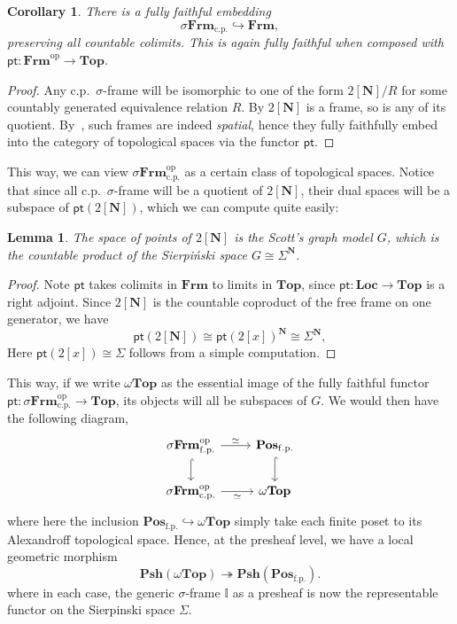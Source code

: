 \documentclass[12pt]{amsart}
\newtheorem{lemma}[theorem]{Lemma}
\newtheorem{corollary}[theorem]{Corollary}
\theoremstyle{definition}
\newcommand{\mb}[1]{\mathbf{#1}}
\newcommand{\mbb}[1]{\mathbb{#1}}
\newcommand{\I}{\mbb I}
\newcommand{\mr}[1]{\mathrm{#1}}
\newcommand{\ms}[1]{\mathsf{#1}}
\newcommand{\Pos}{\mb{Pos}}
\newcommand{\psh}{\mb{Psh}}
\newcommand{\op}{^{\mathrm{op}}}
\newcommand{\surj}{\twoheadrightarrow}
\newcommand{\hook}{\hookrightarrow}
\newcommand{\fp}{_{\mr{f.p.}}}
\newcommand{\cp}{_{\mr{c.p.}}}
\newcommand{\N}{\mb N}
\newcommand{\pt}{\ms{pt}}
\newcommand{\sFrm}{\sigma\mb{Frm}}
\newcommand{\Frm}{\mb{Frm}}
\newcommand{\Loc}{\mb{Loc}}
\newcommand{\Topp}{\mb{Top}}
\newcommand{\wTop}{\omega\mb{Top}}
\begin{document}
\begin{corollary}\label{cor:dualsframe}
  There is a fully faithful embedding
  \[ \sFrm\cp \hook \Frm, \]
  preserving all countable colimits. This is again fully faithful when composed with $\ms{pt} : \Frm\op \to \Topp$. 
\end{corollary}
\begin{proof}
  Any c.p.\ $\sigma$-frame will be isomorphic to one of the form $2[\N]/R$ for some countably generated equivalence relation $R$. By  $2[\N]$ is a frame, so is any of its quotient. By~\cite[Thm. 6.2.4]{makkai2006first}, such frames are indeed \emph{spatial}, hence they fully faithfully embed into the category of topological spaces via the functor $\pt$.
\end{proof}

This way, we can view $\sFrm\cp\op$ as a certain class of topological spaces. Notice that since all c.p.\ $\sigma$-frame will be a quotient of $2[\N]$, their dual spaces will be a subspace of $\pt(2[\N])$, which we can compute quite easily:

\begin{lemma}
  The space of points of $2[\N]$ is the Scott's graph model $G$, which is the countable product of the Sierpi\'nski space $G \cong \Sigma^\N$.
\end{lemma}
\begin{proof}
  Note $\pt$ takes colimits in $\Frm$ to limits in $\Topp$, since $\pt : \Loc \to \Topp$ is a right adjoint. Since $2[\N]$ is the countable coproduct of the free frame on one generator, we have
  \[ \pt(2[\N]) \cong \pt(2[x])^\N \cong \Sigma^\N, \]
  Here $\pt(2[x]) \cong \Sigma$ follows from a simple computation.
\end{proof}

This way, if we write $\wTop$ as the essential image of the fully faithful functor $\pt : \sFrm\cp\op \to \Topp$, its objects will all be subspaces of $G$. We would then have the following diagram,
\[
\begin{tikzcd}
  \sFrm\fp\op \ar[d, hook] \ar[r, "\simeq"] & \Pos\fp \ar[d, hook] \\
  \sFrm\cp\op \ar[r, "\simeq"'] & \wTop
\end{tikzcd}
\]
where here the inclusion $\Pos\fp \hook \wTop$ simply take each finite poset to its Alexandroff topological space. Hence, at the presheaf level, we have a local geometric morphism
\[ \psh(\wTop) \surj \psh(\Pos\fp). \]
where in each case, the generic $\sigma$-frame $\I$ as a presheaf is now the representable functor on the Sierpinski space $\Sigma$. 
\end{document}
